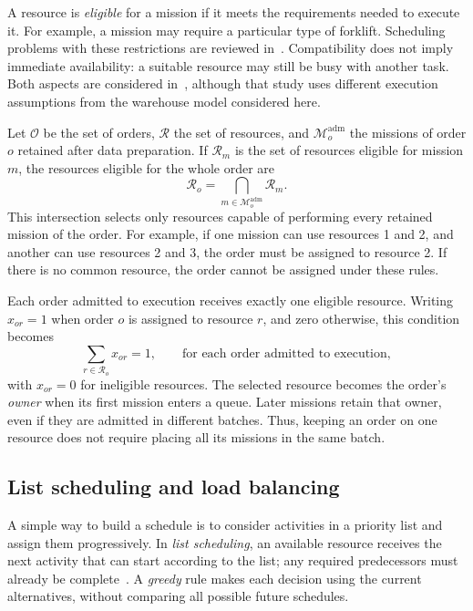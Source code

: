 A resource is \textit{eligible} for a mission if it meets the requirements needed
to execute it. For example, a mission may require a particular type of forklift.
Scheduling problems with these restrictions are reviewed
in~\cite{leung2008processing,leung2016processing}. Compatibility does not imply
immediate availability: a suitable resource may still be busy with another task.
Both aspects are considered in~\cite{liao2008parallel}, although that study uses
different execution assumptions from the warehouse model considered here.

Let $\mathcal O$ be the set of orders, $\mathcal R$ the set of resources, and
$\mathcal M_o^{\mathrm{adm}}$ the missions of order $o$ retained after data
preparation. If $\mathcal R_m$ is the set of resources eligible for mission $m$,
the resources eligible for the whole order are
\begin{equation}
    \mathcal R_o=\bigcap_{m\in\mathcal M_o^{\mathrm{adm}}}\mathcal R_m.
    \label{eq:order-eligible-resources}
\end{equation}
This intersection selects only resources capable of performing every retained
mission of the order. For example, if one mission can use resources 1 and 2,
and another can use resources 2 and 3, the order must be assigned to resource 2.
If there is no common resource, the order cannot be assigned under these rules.

Each order admitted to execution receives exactly one eligible resource.
Writing $x_{or}=1$ when order $o$ is assigned to resource $r$, and zero otherwise,
this condition becomes
\begin{equation}
    \sum_{r\in\mathcal R_o}x_{or}=1,
    \qquad\text{for each order admitted to execution},
    \label{eq:unique-order-assignment}
\end{equation}
with $x_{or}=0$ for ineligible resources. The selected resource becomes the
order's \textit{owner} when its first mission enters a queue. Later missions
retain that owner, even if they are admitted in different batches. Thus, keeping
an order on one resource does not require placing all its missions in the same
batch.

\subsection{List scheduling and load balancing}
\label{sec:theory-list-scheduling}

A simple way to build a schedule is to consider activities in a priority list
and assign them progressively. In \textit{list scheduling}, an available
resource receives the next activity that can start according to the list;
any required predecessors must already be complete~\cite{graham1966bounds}.
A \textit{greedy} rule makes each decision using the current alternatives,
without comparing all possible future schedules.

